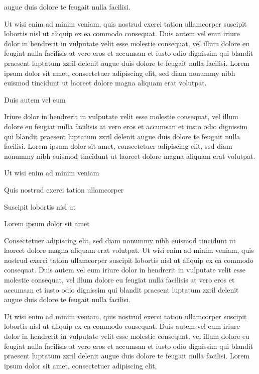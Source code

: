 \documentclass[11pt,twoside]{article}\makeatletter
\begin{document}
      augue duis dolore te feugait nulla facilisi.\par Ut wisi enim ad minim veniam, quis nostrud exerci tation
      ullamcorper suscipit lobortis nisl ut aliquip ex ea commodo
      consequat. Duis autem vel eum iriure dolor in hendrerit in vulputate
      velit esse molestie consequat, vel illum dolore eu feugiat nulla
      facilisis at vero eros et accumsan et iusto odio dignissim qui blandit
      praesent luptatum zzril delenit augue duis dolore te feugait nulla
      facilisi. Lorem ipsum dolor sit amet, consectetuer adipiscing elit,
      sed diam nonummy nibh euismod tincidunt ut laoreet dolore magna
      aliquam erat volutpat. \par Duis autem vel eum \par Iriure dolor in hendrerit in vulputate velit esse molestie
      consequat, vel illum dolore eu feugiat nulla facilisis at vero eros et
      accumsan et iusto odio dignissim qui blandit praesent luptatum zzril
      delenit augue duis dolore te feugait nulla facilisi. Lorem ipsum dolor
      sit amet, consectetuer adipiscing elit, sed diam nonummy nibh euismod
      tincidunt ut laoreet dolore magna aliquam erat volutpat. \par Ut wisi enim ad minim veniam\par Quis nostrud exerci tation ullamcorper \par Suscipit lobortis nisl ut \par Lorem ipsum dolor sit amet\par Consectetuer adipiscing elit, sed diam nonummy nibh euismod
      tincidunt ut laoreet dolore magna aliquam erat volutpat. Ut wisi enim
      ad minim veniam, quis nostrud exerci tation ullamcorper suscipit
      lobortis nisl ut aliquip ex ea commodo consequat. Duis autem vel eum
      iriure dolor in hendrerit in vulputate velit esse molestie consequat,
      vel illum dolore eu feugiat nulla facilisis at vero eros et accumsan
      et iusto odio dignissim qui blandit praesent luptatum zzril delenit
      augue duis dolore te feugait nulla facilisi.\par Ut wisi enim ad minim veniam, quis nostrud exerci tation
      ullamcorper suscipit lobortis nisl ut aliquip ex ea commodo
      consequat. Duis autem vel eum iriure dolor in hendrerit in vulputate
      velit esse molestie consequat, vel illum dolore eu feugiat nulla
      facilisis at vero eros et accumsan et iusto odio dignissim qui blandit
      praesent luptatum zzril delenit augue duis dolore te feugait nulla
      facilisi. Lorem ipsum dolor sit amet, consectetuer adipiscing elit,
\end{document}
